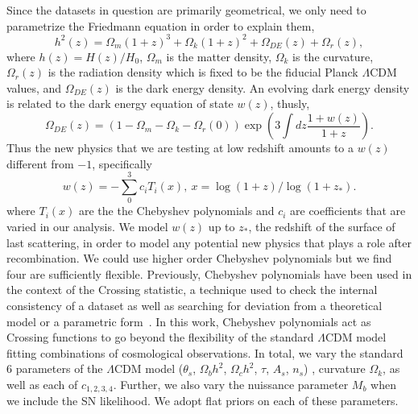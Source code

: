 \documentclass[
 reprint,
 amsmath,amssymb,
 aps,
]{revtex4-2}
\begin{document}
Since the datasets in question are primarily geometrical, we only need to parametrize the Friedmann equation in order to explain them,
\begin{equation}
    h^2(z) = \Omega_m (1+z)^3 + \Omega_k (1+z)^2 + \Omega_{DE}(z) + \Omega_r(z)  ,
\end{equation}
where $h(z) = H(z)/H_0$, $\Omega_m$ is the matter density, $\Omega_k$ is the curvature, $\Omega_{r}(z)$ is the radiation density which is fixed to be the fiducial Planck $\Lambda$CDM values, 
and $\Omega_{DE}(z)$ is the dark energy density.  An evolving dark energy density is related to the dark energy equation of state $w(z)$, thusly,
\begin{equation}
    \Omega_{DE}(z) = (1-\Omega_m-\Omega_k-\Omega_r(0))\exp\left(3 \int dz \frac{1+w(z)}{1+z}\right). 
\end{equation}
Thus the new physics that we are testing at low redshift amounts to a $w(z)$ different from $-1$, specifically
\begin{equation}
    w(z) = -\sum_0^3 c_i T_i(x), \ x = \log(1+z)/\log(1+z_*).
\end{equation}
where $T_i(x)$ are the the Chebyshev polynomials and $c_i$ are coefficients that are varied in our analysis. We model $w(z)$ up to $z_*$, the redshift of the surface of last scattering, in order to model any potential new physics that plays a role after recombination. We could use higher order Chebyshev polynomials but we find four are sufficiently flexible. Previously, Chebyshev polynomials have been used in the context of the Crossing statistic, a technique used to check the internal consistency of a dataset as well as searching for deviation from a theoretical model or a parametric form~\cite{Shafieloo:2012jb,Shafieloo:2012yh,Shafieloo:2016zga}. In this work, Chebyshev polynomials act as Crossing functions to go beyond the flexibility of the standard $\Lambda$CDM model fitting combinations of cosmological observations. In total, we vary the standard 6 parameters of the $\Lambda$CDM model ($\theta_s$, $\Omega_bh^2$, $\Omega_ch^2$, $\tau$, $A_s$, $n_s$)
, curvature $\Omega_k$, as well as each of $c_{1,2,3,4}$. Further, we also vary the nuissance parameter $M_b$ when we include the SN likelihood. We adopt flat priors on each of these parameters.
\end{document}
